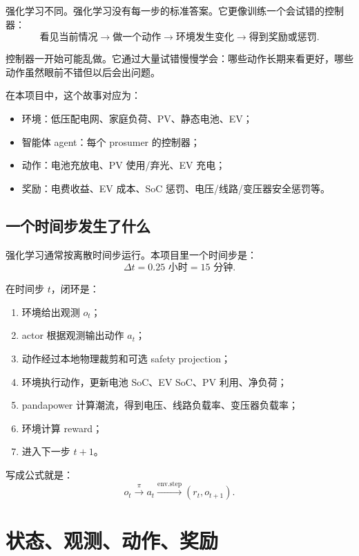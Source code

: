 \documentclass[UTF8,zihao=-4]{ctexart}
\begin{document}
强化学习不同。强化学习没有每一步的标准答案。它更像训练一个会试错的控制器：
\begin{equation}
\text{看见当前情况}
\rightarrow
\text{做一个动作}
\rightarrow
\text{环境发生变化}
\rightarrow
\text{得到奖励或惩罚}.
\end{equation}

控制器一开始可能乱做。它通过大量试错慢慢学会：哪些动作长期来看更好，哪些动作虽然眼前不错但以后会出问题。

在本项目中，这个故事对应为：
\begin{itemize}
  \item 环境：低压配电网、家庭负荷、PV、静态电池、EV；
  \item 智能体 agent：每个 prosumer 的控制器；
  \item 动作：电池充放电、PV 使用/弃光、EV 充电；
  \item 奖励：电费收益、EV 成本、SoC 惩罚、电压/线路/变压器安全惩罚等。
\end{itemize}

\subsection{一个时间步发生了什么}

强化学习通常按离散时间步运行。本项目里一个时间步是：
\begin{equation}
\Delta t=0.25\text{ 小时}=15\text{ 分钟}.
\end{equation}

在时间步 $t$，闭环是：
\begin{enumerate}
  \item 环境给出观测 $o_t$；
  \item actor 根据观测输出动作 $a_t$；
  \item 动作经过本地物理裁剪和可选 safety projection；
  \item 环境执行动作，更新电池 SoC、EV SoC、PV 利用、净负荷；
  \item pandapower 计算潮流，得到电压、线路负载率、变压器负载率；
  \item 环境计算 reward；
  \item 进入下一步 $t+1$。
\end{enumerate}

写成公式就是：
\begin{equation}
o_t \xrightarrow{\pi} a_t
\xrightarrow{\text{env.step}}
(r_t,o_{t+1}).
\end{equation}

\section{状态、观测、动作、奖励}
\end{document}
